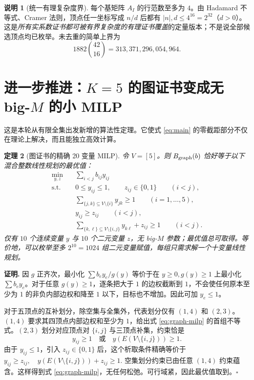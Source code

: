 \documentclass[11pt,a4paper]{ctexart}
\newtheorem{theorem}{定理}[section]
\theoremstyle{definition}
\newtheorem{remark}[theorem]{说明}
\newenvironment{proofcn}{\par\noindent\textbf{证明.} }{\hfill$\square$\par}
\begin{document}
\begin{remark}[统一有理复杂度界]
每个基矩阵 $A_I$ 的行范数至多为 $4$。由 Hadamard 不等式、Cramer 法则，顶点任一坐标写成 $n/d$ 后都有 $|n|,d\le4^{16}=2^{32}$（$d>0$）。这是\emph{所有实系数证书都可被有界复杂度的有理证书覆盖}的定量版本；不是说全部候选顶点均已枚举。未去重的简单上界为
\[
1882\binom{42}{16}=313{,}371{,}296{,}054{,}964.
\]
\end{remark}

\section{进一步推进：$K=5$ 的图证书变成无 big-$M$ 的小 MILP}
这是本轮从有限全集出发新增的算法性定理。它使式 \eqref{eq:main} 的零截距部分不仅在理论上解决，而且能独立高效计算。

\begin{theorem}[图证书的精确 20 变量 MILP]\label{thm:graph-milp}
令 $V=[5]$。则 $B_{\rm graph}(b)$ 恰好等于以下混合整数线性规划的最优值：
\begin{equation}\label{eq:graph-milp}
\boxed{
\begin{aligned}
\min_{y,z}\quad&\sum_{i<j}b_{ij}y_{ij}\\
\text{s.t.}\quad&0\le y_{ij}\le1,\qquad z_{ij}\in\{0,1\}\qquad(i<j),\\
&\sum_{\{j,k\}\subseteq V\setminus\{i\}}y_{jk}\ge1 \qquad (i=1,\dots,5),\\
&y_{ij}\ge z_{ij}\qquad(i<j),\\
&\sum_{\{k,\ell\}\subseteq V\setminus\{i,j\}}y_{k\ell}+z_{ij}\ge1\qquad(i<j).
\end{aligned}}
\end{equation}
仅有 $10$ 个连续变量 $y$ 与 $10$ 个二元变量 $z$，无 big-$M$ 参数；最优值总可取得。等价地，可以枚举至多 $2^{10}=1024$ 组二元变量赋值，每组只需求解一个十变量线性规划。
\end{theorem}
\begin{proofcn}
因 $g$ 正齐次，最小化 $\sum b_ey_e/g(y)$ 等价于在 $y\ge0,g(y)\ge1$ 上最小化 $\sum b_ey_e$。对于任意 $g(y)\ge1$，逐条把大于 $1$ 的边权截断到 $1$，不会使任何原本至少为 $1$ 的非负内部边权和降至 $1$ 以下，目标也不增加。因此可加 $y_e\le1$。

对于五顶点的互补划分，除空集与全集外，代表划分仅有 $(1,4)$ 和 $(2,3)$。$(1,4)$ 要求其四顶点内部边权和至少为 $1$，给出式 \eqref{eq:graph-milp} 的首组不等式。$(2,3)$ 划分对应顶点对 $\{i,j\}$ 与三顶点补集，约束恰是
\[
y_{ij}\ge1\quad\text{或}\quad y(E(V\setminus\{i,j\}))\ge1.
\]
由于 $y_{ij}\le1$，引入 $z_{ij}\in\{0,1\}$ 后，这个析取条件精确等价于
\(
y_{ij}\ge z_{ij},\quad y(E(V\setminus\{i,j\}))+z_{ij}\ge1.
\)
空集划分约束已由任意 $(1,4)$ 约束蕴含。这样得到式 \eqref{eq:graph-milp}，无任何松弛。可行域紧，因此最优值取到。\end{proofcn}
\end{document}
